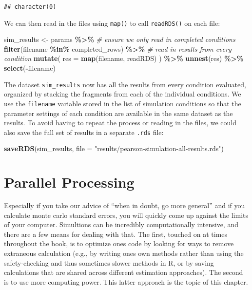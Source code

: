 \documentclass[
]{book}
\newenvironment{Shaded}{\begin{snugshade}}{\end{snugshade}}
\newcommand{\AttributeTok}[1]{\textcolor[rgb]{0.13,0.29,0.53}{#1}}
\newcommand{\CommentTok}[1]{\textcolor[rgb]{0.56,0.35,0.01}{\textit{#1}}}
\newcommand{\FunctionTok}[1]{\textcolor[rgb]{0.13,0.29,0.53}{\textbf{#1}}}
\newcommand{\NormalTok}[1]{#1}
\newcommand{\OtherTok}[1]{\textcolor[rgb]{0.56,0.35,0.01}{#1}}
\newcommand{\SpecialCharTok}[1]{\textcolor[rgb]{0.81,0.36,0.00}{\textbf{#1}}}
\newcommand{\StringTok}[1]{\textcolor[rgb]{0.31,0.60,0.02}{#1}}
\begin{document}
\begin{verbatim}
## character(0)
\end{verbatim}

We can then read in the files using \texttt{map()} to call \texttt{readRDS()} on each file:

\begin{Shaded}
\begin{Highlighting}[]
\NormalTok{sim\_results }\OtherTok{\textless{}{-}} 
\NormalTok{  params }\SpecialCharTok{\%\textgreater{}\%}
  \CommentTok{\# ensure we only read in completed conditions}
  \FunctionTok{filter}\NormalTok{(filename }\SpecialCharTok{\%in\%}\NormalTok{ completed\_rows) }\SpecialCharTok{\%\textgreater{}\%}
  \CommentTok{\# read in results from every condition}
  \FunctionTok{mutate}\NormalTok{(}
    \AttributeTok{res =} \FunctionTok{map}\NormalTok{(filename, readRDS)}
\NormalTok{  ) }\SpecialCharTok{\%\textgreater{}\%}
  \FunctionTok{unnest}\NormalTok{(res) }\SpecialCharTok{\%\textgreater{}\%}
  \FunctionTok{select}\NormalTok{(}\SpecialCharTok{{-}}\NormalTok{filename)}
\end{Highlighting}
\end{Shaded}

The dataset \texttt{sim\_results} now has all the results from every condition evaluated, organized by stacking the fragments from each of the individual conditions.
We use the \texttt{filename} variable stored in the list of simulation conditions so that the parameter settings of each condition are available in the same dataset as the results.
To avoid having to repeat the process or reading in the files, we could also save the full set of results in a separate \texttt{.rds} file:

\begin{Shaded}
\begin{Highlighting}[]
\FunctionTok{saveRDS}\NormalTok{(sim\_results, }\AttributeTok{file =} \StringTok{"results/pearson{-}simulation{-}all{-}results.rds"}\NormalTok{)}
\end{Highlighting}
\end{Shaded}

\chapter{Parallel Processing}\label{parallel-processing}

Especially if you take our advice of ``when in doubt, go more general'' and if you calculate monte carlo standard errors, you will quickly come up against the limits of your computer.
Simultions can be incredibly computationally intensive, and there are a few means for dealing with that.
The first, touched on at times throughout the book, is to optimize ones code by looking for ways to remove extraneous calculation (e.g., by writing ones own methods rather than using the safety-checking and thus sometimes slower methods in R, or by saving calculations that are shared across different estimation approaches).
The second is to use more computing power.
This latter approach is the topic of this chapter.
\end{document}
